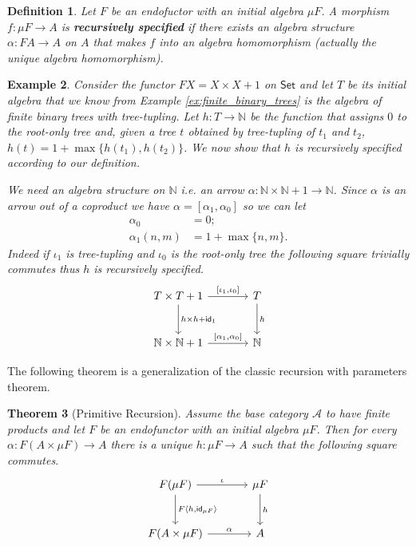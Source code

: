 \documentclass[letterpaper, 11pt, oneside]{memoir}
\theoremstyle{myteo}
\newtheorem{theorem}{Theorem}[section]
\newtheorem{definition}[theorem]{Definition}
\newtheorem{example}[theorem]{Example}
\numberwithin{equation}{section}
\newcommand{\marginnote}[1]{\marginpar{\footnotesize #1}}
\newcommand{\id}{\textsf{id}}
\newcommand{\Set}{\textsf{Set}}
\newcommand{\N}{\mathbb{N}}
\newcommand{\outofcoprod}[2]{{[#1, #2]}}
\newcommand{\intoprod}[2]{{\langle #1, #2\rangle}}
\begin{document}
\begin{definition}
  Let \(F\) be an endofuctor with an initial algebra \(\mu F\).
  A morphism \(f \colon \mu F \to A\) is \textbf{recursively specified} \marginnote{recursively specified morphism} if there exists an algebra structure \(\alpha \colon FA \to A\) on \(A\) that makes \(f\) into an algebra homomorphism (actually the unique algebra homomorphism).
\end{definition}

\begin{example}
  Consider the functor \(FX = X \times X + 1\) on \(\Set\) and let \(T\) be its initial algebra that we know from Example \ref{ex:finite_binary_trees} is the algebra of finite binary trees with tree-tupling.
  Let \(h \colon T \to \mathbb{N}\) be the function that assigns \(0\) to the root-only tree and, given a tree \(t\) obtained by tree-tupling of \(t_1\) and \(t_2\), \(h(t) = 1 + \max\{h(t_1), h(t_2)\}\).
  We now show that \(h\) is recursively specified according to our definition.

  We need an algebra structure on \(\mathbb{N}\) i.e. an arrow \(\alpha \colon \N \times \N + 1 \to \N\).
  Since \(\alpha\) is an arrow out of a coproduct we have \(\alpha = [\alpha_1, \alpha_0]\) so we can let
  \begin{align*}
    \alpha_0 &= 0;\\
    \alpha_1(n, m) &= 1 + \max\{n, m\}.
  \end{align*}
  Indeed if \(\iota_1\) is tree-tupling and \(\iota_0\) is the root-only tree the following square trivially commutes thus \(h\) is recursively specified.
  \begin{equation*}
    \begin{tikzcd}[sep = large]
      T \times T + 1 \ar[r, "\outofcoprod{\iota_1}{\iota_0}"] \ar[d, "h \times h + \id_1"] & T \ar[d, "h"]\\
      \N \times \N + 1 \ar[r, "\outofcoprod{\alpha_1}{\alpha_0}"] & \N
    \end{tikzcd}
  \end{equation*}
\end{example}

The following theorem is a generalization of the classic recursion with parameters theorem.

\begin{theorem}[Primitive Recursion]
  \label{teo:primitive_recursion}
  Assume the base category \(\mathscr{A}\) to have finite products and let \(F\) be an endofunctor with an initial algebra \(\mu F\).
  Then for every \(\alpha \colon F(A \times \mu F) \to A\) there is a unique \(h \colon \mu F \to A\) such that the following square commutes.
  \begin{equation}
    \label{dia:recursion}
    \begin{tikzcd}[sep = large]
      F(\mu F) \ar[r, "\iota"] \ar[d, "F \intoprod{h}{\id_{\mu F}}"] & \mu F \ar[d, "h"] \\
      F(A \times \mu F) \ar[r, "\alpha"] & A
    \end{tikzcd}
  \end{equation}
\end{theorem}
\end{document}
